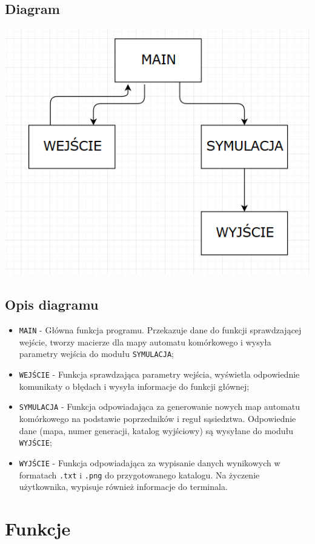 \documentclass[a4paper,12pt]{article}
\begin{document}
\subsection{Diagram}
\begin{center}
	\includegraphics[scale=1]{diagram.png}
\end{center}
\subsection{Opis diagramu}
\begin{itemize}
\item \texttt{MAIN} - Główna funkcja programu. Przekazuje dane do funkcji sprawdzającej wejście, tworzy macierze dla mapy automatu komórkowego i wysyła parametry wejścia do modułu \texttt{SYMULACJA};
\item \texttt{WEJŚCIE} - Funkcja sprawdzająca parametry wejścia, wyświetla odpowiednie komunikaty o błędach i wysyła informacje do funkcji głównej;
\item \texttt{SYMULACJA} - Funkcja odpowiadająca za generowanie nowych map automatu komórkowego na podstawie poprzedników i reguł sąsiedztwa. Odpowiednie dane (mapa, numer generacji, katalog wyjściowy) są wysyłane do modułu \texttt{WYJŚCIE};
\item \texttt{WYJŚCIE} - Funkcja odpowiadająca za wypisanie danych wynikowych w formatach \texttt{.txt} i \texttt{.png} do przygotowanego katalogu. Na życzenie użytkownika, wypisuje również informacje do terminala.
\end{itemize}
\section{Funkcje}
\end{document}
